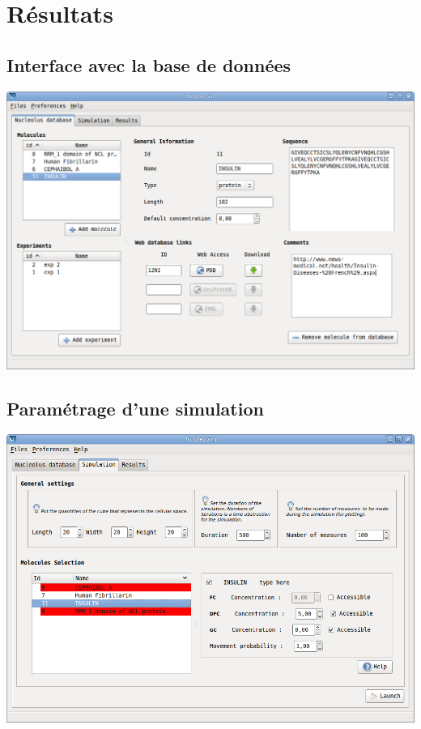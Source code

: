 \documentclass{beamer}
\begin{document}

\section{Résultats}

\subsection{Interface avec la base de données}

\begin{frame}
  \begin{center}
      \includegraphics[width=0.9\columnwidth]{img/inter1.png}
  \end{center}
\end{frame}

\subsection{Paramétrage d'une simulation}
\begin{frame}
  \begin{center}
      \includegraphics[width=0.9\columnwidth]{img/inter2.png}
  \end{center}
\end{frame}
\end{document}
